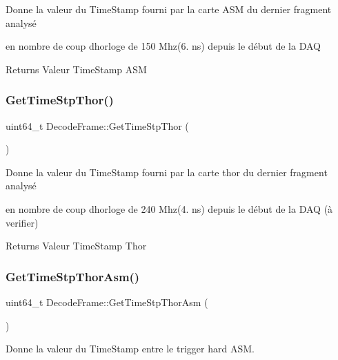 Donne la valeur du Time\+Stamp fourni par la carte A\+SM du dernier fragment analysé 

en nombre de coup d\textquotesingle{}horloge de 150 Mhz(6. ns) depuis le début de la D\+AQ \begin{DoxyReturn}{Returns}
Valeur Time\+Stamp A\+SM 
\end{DoxyReturn}
\mbox{\label{classDecodeFrame_a81f93958ad2e294cb165ca1fda16e6d5}} 
\subsubsection{\texorpdfstring{Get\+Time\+Stp\+Thor()}{GetTimeStpThor()}}
{\footnotesize\ttfamily uint64\+\_\+t Decode\+Frame\+::\+Get\+Time\+Stp\+Thor (\begin{DoxyParamCaption}{ }\end{DoxyParamCaption})\hspace{0.3cm}{\ttfamily [inline]}}



Donne la valeur du Time\+Stamp fourni par la carte thor du dernier fragment analysé 

en nombre de coup d\textquotesingle{}horloge de 240 Mhz(4. ns) depuis le début de la D\+AQ (à verifier) \begin{DoxyReturn}{Returns}
Valeur Time\+Stamp Thor 
\end{DoxyReturn}
\mbox{\label{classDecodeFrame_a69475a7cd412ac056bc97f16768b470b}} 
\subsubsection{\texorpdfstring{Get\+Time\+Stp\+Thor\+Asm()}{GetTimeStpThorAsm()}}
{\footnotesize\ttfamily uint64\+\_\+t Decode\+Frame\+::\+Get\+Time\+Stp\+Thor\+Asm (\begin{DoxyParamCaption}{ }\end{DoxyParamCaption})\hspace{0.3cm}{\ttfamily [inline]}}



Donne la valeur du Time\+Stamp entre le trigger hard A\+SM. 

